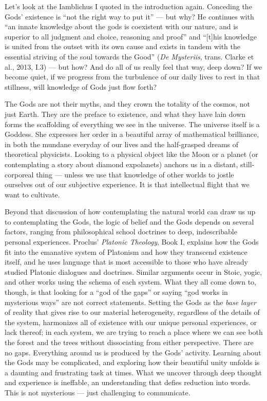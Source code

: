 \documentclass[
]{book}
\begin{document}
Let's look at the Iamblichus I quoted in the introduction again. Conceding the Gods' existence is ``not the right way to put it'' --- but why? He continues with ``an innate knowledge about the gods is coexistent with our nature, and is superior to all judgment and choice, reasoning and proof'' and ``{[}t{]}his knowledge is united from the outset with its own cause and exists in tandem with the essential striving of the soul towards the Good'' (\emph{De Mysteriis}, trans. Clarke et al., 2013, I.3) --- but how? And do all of us really feel that way, deep down? If we become quiet, if we progress from the turbulence of our daily lives to rest in that stillness, will knowledge of Gods just flow forth?

The Gods are not their myths, and they crown the totality of the cosmos, not just Earth. They are the preface to existence, and what they have lain down forms the scaffolding of everything we see in the universe. The universe itself is a Goddess. She expresses her order in a beautiful array of mathematical brilliance, in both the mundane everyday of our lives and the half-grasped dreams of theoretical physicists. Looking to a physical object like the Moon or a planet (or contemplating a story about diamond expolanets) anchors us in a distant, still-corporeal thing --- unless we use that knowledge of other worlds to jostle ourselves out of our subjective experience. It is that intellectual flight that we want to cultivate.

Beyond that discussion of how contemplating the natural world can draw us up to contemplating the Gods, the logic of belief and the Gods depends on several factors, ranging from philosophical school doctrines to deep, indescribable personal experiences. Proclus' \emph{Platonic Theology}, Book I, explains how the Gods fit into the emanative system of Platonism and how they transcend existence itself, and he uses language that is most accessible to those who have already studied Platonic dialogues and doctrines. Similar arguments occur in Stoic, yogic, and other works using the schema of each system. What they all come down to, though, is that looking for a ``god of the gaps'' or saying ``god works in mysterious ways'' are not correct statements. Setting the Gods as the \emph{base layer} of reality that gives rise to our material heterogeneity, regardless of the details of the system, harmonizes all of existence with our unique personal experiences, or lack thereof; in each system, we are trying to reach a place where we can see both the forest and the trees without dissociating from either perspective. There are no gaps. Everything around us is produced by the Gods' activity. Learning about the Gods may be complicated, and exploring how their beautiful unity unfolds is a daunting and frustrating task at times. What we uncover through deep thought and experience is ineffable, an understanding that defies reduction into words. This is not mysterious --- just challenging to communicate.
\end{document}
